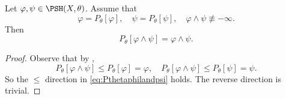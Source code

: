 \begin{proposition}\label{prop:landpresmodel}
    Let $\varphi,\psi\in \PSH(X,\theta)$. Assume that
    \begin{equation}\label{eq:varphipsimodel_landpsh}
        \varphi=P_{\theta}[\varphi],\quad \psi=P_{\theta}[\psi],\quad \varphi\land \psi\not\equiv -\infty.
    \end{equation}
    Then
    \begin{equation}\label{eq:Pthetaphilandpsi}
        P_{\theta}[\varphi\land \psi]=\varphi\land \psi.
    \end{equation}
\end{proposition}
\begin{proof}
    Observe that by ,
    \[
        P_{\theta}[\varphi\land \psi]\leq P_{\theta}[\varphi]=\varphi,\quad P_{\theta}[\varphi\land \psi]\leq P_{\theta}[\psi]=\psi.
    \]
    So the $\leq$ direction in \eqref{eq:Pthetaphilandpsi} holds. The reverse direction is trivial.
\end{proof}

